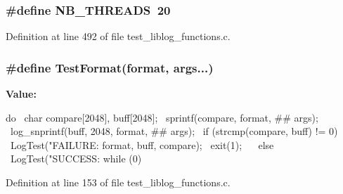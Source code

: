 \subsubsection[{NB\_\-THREADS}]{\setlength{\rightskip}{0pt plus 5cm}\#define NB\_\-THREADS~20}\label{test__liblog__functions_8c_a93efd606e54bc5bfcc8fd6a0709b5487}


Definition at line 492 of file test\_\-liblog\_\-functions.c.
\subsubsection[{TestFormat}]{\setlength{\rightskip}{0pt plus 5cm}\#define TestFormat(format, \/  args...)}\label{test__liblog__functions_8c_a0461f46c1a6f55e5406bf831f72c2dbb}
{\bfseries Value:}
\begin{DoxyCode}
do {                                                  \
    char compare[2048], buff[2048];                     \
    sprintf(compare, format, ## args);                  \
    log_snprintf(buff, 2048, format, ## args);          \
    if (strcmp(compare, buff) != 0)                     \
      {                                                 \
        LogTest("FAILURE: %
                format, buff, compare);                 \
        exit(1);                                        \
      }                                                 \
    else                                                \
      LogTest("SUCCESS: %
  } while (0)
\end{DoxyCode}


Definition at line 153 of file test\_\-liblog\_\-functions.c.
